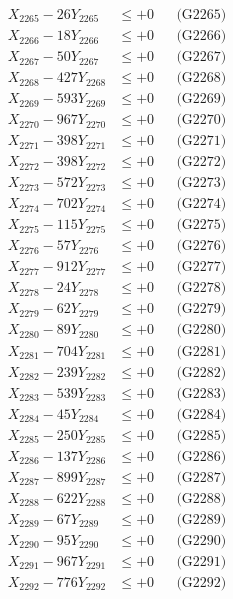 \documentclass[a4paper,10pt]{article}
\begin{document}
{\begin{align}
X_{2265} - 26Y_{2265} &\leq +0 && \text{(G2265)} \\
X_{2266} - 18Y_{2266} &\leq +0 && \text{(G2266)} \\
X_{2267} - 50Y_{2267} &\leq +0 && \text{(G2267)} \\
X_{2268} - 427Y_{2268} &\leq +0 && \text{(G2268)} \\
X_{2269} - 593Y_{2269} &\leq +0 && \text{(G2269)} \\
X_{2270} - 967Y_{2270} &\leq +0 && \text{(G2270)} \\
\allowbreak
X_{2271} - 398Y_{2271} &\leq +0 && \text{(G2271)} \\
X_{2272} - 398Y_{2272} &\leq +0 && \text{(G2272)} \\
X_{2273} - 572Y_{2273} &\leq +0 && \text{(G2273)} \\
X_{2274} - 702Y_{2274} &\leq +0 && \text{(G2274)} \\
X_{2275} - 115Y_{2275} &\leq +0 && \text{(G2275)} \\
X_{2276} - 57Y_{2276} &\leq +0 && \text{(G2276)} \\
X_{2277} - 912Y_{2277} &\leq +0 && \text{(G2277)} \\
X_{2278} - 24Y_{2278} &\leq +0 && \text{(G2278)} \\
X_{2279} - 62Y_{2279} &\leq +0 && \text{(G2279)} \\
X_{2280} - 89Y_{2280} &\leq +0 && \text{(G2280)} \\
\allowbreak
X_{2281} - 704Y_{2281} &\leq +0 && \text{(G2281)} \\
X_{2282} - 239Y_{2282} &\leq +0 && \text{(G2282)} \\
X_{2283} - 539Y_{2283} &\leq +0 && \text{(G2283)} \\
X_{2284} - 45Y_{2284} &\leq +0 && \text{(G2284)} \\
X_{2285} - 250Y_{2285} &\leq +0 && \text{(G2285)} \\
X_{2286} - 137Y_{2286} &\leq +0 && \text{(G2286)} \\
X_{2287} - 899Y_{2287} &\leq +0 && \text{(G2287)} \\
X_{2288} - 622Y_{2288} &\leq +0 && \text{(G2288)} \\
X_{2289} - 67Y_{2289} &\leq +0 && \text{(G2289)} \\
X_{2290} - 95Y_{2290} &\leq +0 && \text{(G2290)} \\
\allowbreak
X_{2291} - 967Y_{2291} &\leq +0 && \text{(G2291)} \\
X_{2292} - 776Y_{2292} &\leq +0 && \text{(G2292)} \\

\end{align}}
\end{document}
